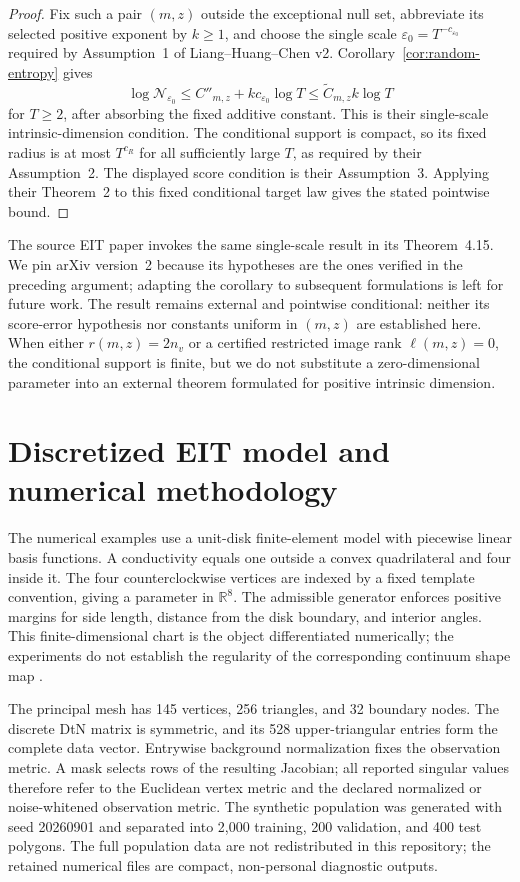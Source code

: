\documentclass[11pt]{article}
\theoremstyle{definition}
\newcommand{\R}{\mathbb R}
\newcommand{\cN}{\mathcal N}
\begin{document}
\begin{proof}
Fix such a pair $(m,z)$ outside the exceptional null set, abbreviate its
selected positive exponent by $k\ge1$, and choose the single scale
$\varepsilon_0=T^{-c_{\varepsilon_0}}$ required by Assumption~1 of
Liang--Huang--Chen v2.  Corollary~\ref{cor:random-entropy} gives
\[
 \log\cN_{\varepsilon_0}
 \le C''_{m,z}+k c_{\varepsilon_0}\log T
 \le \widetilde C_{m,z}k\log T
\]
for $T\ge2$, after absorbing the fixed additive constant.  This is their
single-scale intrinsic-dimension condition.  The conditional support is
compact, so its fixed radius is at most $T^{c_R}$ for all sufficiently large
$T$, as required by their Assumption~2.  The displayed score condition is
their Assumption~3.  Applying their Theorem~2 to this fixed conditional target
law gives the stated pointwise bound.
\end{proof}

The source EIT paper invokes the same single-scale result in its
Theorem~4.15.  We pin arXiv version~2 because its hypotheses are the ones
verified in the preceding argument; adapting the corollary to subsequent
formulations is left for future work.  The result remains external and
pointwise conditional: neither its score-error hypothesis nor constants
uniform in $(m,z)$ are established here.  When either $r(m,z)=2n_v$ or a
certified restricted image rank $\ell(m,z)=0$, the conditional support is
finite, but we do not substitute a zero-dimensional parameter into an
external theorem formulated for positive intrinsic dimension.

\section{Discretized EIT model and numerical methodology}
\label{sec:eit-methods}

The numerical examples use a unit-disk finite-element model with piecewise
linear basis functions.  A conductivity equals one outside a convex
quadrilateral and four inside it.  The four counterclockwise vertices are
indexed by a fixed template convention, giving a parameter in $\R^8$.  The
admissible generator enforces positive margins for side length, distance from
the disk boundary, and interior angles.  This finite-dimensional chart is the
object differentiated numerically; the experiments do not establish the
regularity of the corresponding continuum shape map
\citep{beretta2017differentiability}.

The principal mesh has 145 vertices, 256 triangles, and 32 boundary nodes.
The discrete DtN matrix is symmetric, and its 528 upper-triangular entries form
the complete data vector.  Entrywise background normalization fixes the
observation metric.  A mask selects rows of the resulting Jacobian; all
reported singular values therefore refer to the Euclidean vertex metric and
the declared normalized or noise-whitened observation metric.  The synthetic
population was generated with seed 20260901 and separated into 2,000 training,
200 validation, and 400 test polygons.  The full population data are not
redistributed in this repository; the retained numerical files are compact,
non-personal diagnostic outputs.
\end{document}
